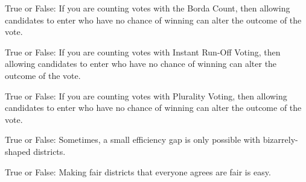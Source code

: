 \documentclass[nooutcomes,noauthor]{ximera}
\author{Bart Snapp}
\begin{document}
\maketitle



\begin{exercise}
  True or False: If you are counting votes with the Borda Count, then
  allowing candidates to enter who have no chance of winning can alter
  the outcome of the vote.
 
\end{exercise}




\begin{exercise}
  True or False: If you are counting votes with Instant Run-Off
  Voting, then allowing candidates to enter who have no chance of
  winning can alter the outcome of the vote.
\end{exercise}




\begin{exercise}
  True or False: If you are counting votes with Plurality Voting, then
  allowing candidates to enter who have no chance of winning can alter
  the outcome of the vote.
\end{exercise}



\begin{exercise}
  True or False: Sometimes, a small efficiency gap is only possible
  with bizarrely-shaped districts.
\end{exercise}




\begin{exercise}
  True or False: Making fair districts that everyone agrees are fair
  is easy.
\end{exercise}



\end{document}
